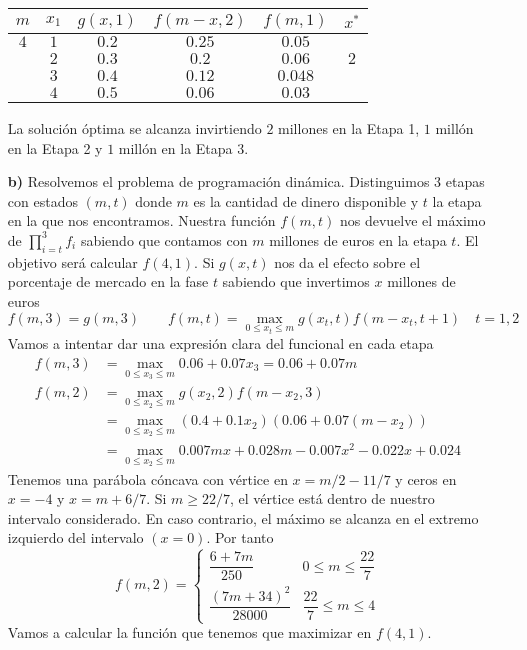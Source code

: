 \documentclass[twoside]{article}
\begin{document}
\begin{solucion}
\begin{itemize}
\begin{center}
\begin{tabular}{|c| c| c| c | c| c|}
\hline
$m$ & $x_1$ & $g(x,1)$ & $f(m-x,2)$ &  $f(m,1)$ & $x^* $ \\
\hline
$4$ & $1$ & $0.2$  & $0.25$  & $0.05$ & \\
\hline            
 & $2$    & $0.3$  &$0.2$ & $0.06$ &$\boxed{2}$\\
\hline            
 & $3$    & $0.4$  &$0.12$ & $0.048$ &\\
\hline
 & $4$ & $0.5$     & $0.06$ & $0.03$&\\
 \hline
\end{tabular}
\end{center}
La solución óptima se alcanza invirtiendo $2$ millones en la Etapa 1, $1$ millón en la Etapa 2 y $1$ millón en la Etapa 3.
\item[\textbf{b)}] Resolvemos el problema de programación dinámica. Distinguimos $3$ etapas con estados $(m,t)$ donde $m$ es la cantidad de dinero disponible y $t$ la etapa en la que nos encontramos. Nuestra función $f(m,t)$ nos devuelve el máximo de $\prod_{i=t}^3 f_i$ sabiendo que contamos con $m$ millones de euros en la etapa $t$. El objetivo será calcular $f(4,1)$. Si $g(x,t)$ nos da el efecto sobre el porcentaje de mercado en la fase $t$ sabiendo que invertimos $x$ millones de euros	
$$
f(m,3) = g(m,3) \qquad f(m,t)=\max_{0\leq x_t\leq m}g(x_t,t)f(m-x_t,t+1) \quad t=1,2
$$
Vamos a intentar dar una expresión clara del funcional en cada etapa
\begin{align*}
f(m,3)  &= \max_{0\leq x_3\leq m}0.06+0.07x_3 = 0.06+0.07m \\
f(m,2)  &= \max_{0\leq x_2\leq m}g(x_2,2)f(m-x_2,3)\\
		&= \max_{0\leq x_2\leq m}(0.4+0.1x_2)(0.06+0.07(m-x_2))\\
		&= \max_{0\leq x_2\leq m} 0.007 m x + 0.028 m - 0.007 x^2 - 0.022 x + 0.024
\end{align*}
Tenemos una parábola cóncava con vértice en $x=m/2 -11/7$ y ceros en $x=-4$ y $x=m+6/7$. Si $m\geq 22/7$, el vértice está dentro de nuestro intervalo considerado. En caso contrario, el máximo se alcanza en el extremo izquierdo del intervalo $(x=0)$. Por tanto
$$
f(m,2) = 
\begin{cases}
\dfrac{6+7m}{250} & 0\leq m \leq \dfrac{22}{7}\\
\dfrac{(7m+34)^2}{28000}& \dfrac{22}{7} \leq m \leq 4
\end{cases}
$$
Vamos a calcular la función que tenemos que maximizar en $f(4,1)$.
\begin{align*}

\end{align*}
\end{itemize}
\end{solucion}
\end{document}
